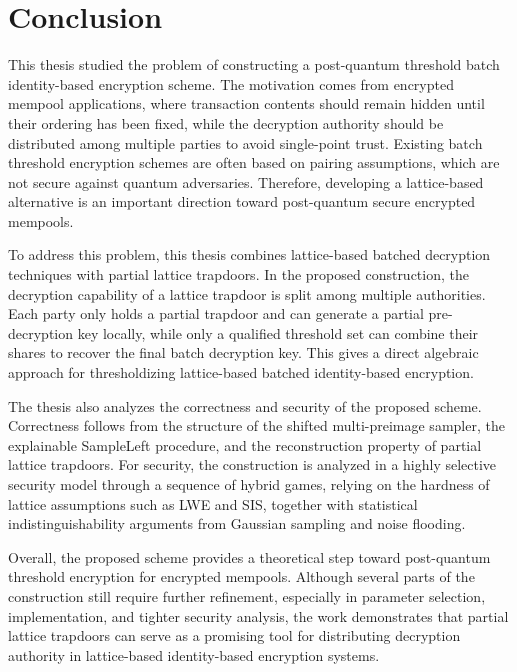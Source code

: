 \section{Conclusion}

This thesis studied the problem of constructing a post-quantum threshold batch identity-based encryption scheme. The motivation comes from encrypted mempool applications, where transaction contents should remain hidden until their ordering has been fixed, while the decryption authority should be distributed among multiple parties to avoid single-point trust. Existing batch threshold encryption schemes are often based on pairing assumptions, which are not secure against quantum adversaries. Therefore, developing a lattice-based alternative is an important direction toward post-quantum secure encrypted mempools.

To address this problem, this thesis combines lattice-based batched decryption techniques with partial lattice trapdoors. In the proposed construction, the decryption capability of a lattice trapdoor is split among multiple authorities. Each party only holds a partial trapdoor and can generate a partial pre-decryption key locally, while only a qualified threshold set can combine their shares to recover the final batch decryption key. This gives a direct algebraic approach for thresholdizing lattice-based batched identity-based encryption.

The thesis also analyzes the correctness and security of the proposed scheme. Correctness follows from the structure of the shifted multi-preimage sampler, the explainable SampleLeft procedure, and the reconstruction property of partial lattice trapdoors. For security, the construction is analyzed in a highly selective security model through a sequence of hybrid games, relying on the hardness of lattice assumptions such as LWE and SIS, together with statistical indistinguishability arguments from Gaussian sampling and noise flooding.

Overall, the proposed scheme provides a theoretical step toward post-quantum threshold encryption for encrypted mempools. Although several parts of the construction still require further refinement, especially in parameter selection, implementation, and tighter security analysis, the work demonstrates that partial lattice trapdoors can serve as a promising tool for distributing decryption authority in lattice-based identity-based encryption systems.
